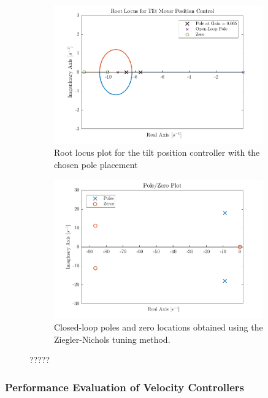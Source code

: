 \documentclass[../../main.tex]{subfiles}
\begin{document}
\begin{figure}[h]
\begin{subfigure}{0.49\textwidth}
    \includegraphics[width = 0.99\textwidth]{Sections/System_Design/Images/RL_TiltMotorVelPolePlace.png}
    \caption{Root locus plot for the tilt position controller with the chosen pole placement}
    \label{fig:vel_root_locus}
\end{subfigure}\quad
\begin{subfigure}{0.49\textwidth}
    \includegraphics[width = 0.99\textwidth]{Sections/System_Design/Images/PoleZero_TiltMotorVel_NZ.png}
    \caption{Closed-loop poles and zero locations obtained using the Ziegler-Nichols tuning method.}
    \label{fig:ZN_pole_zero}
\end{subfigure}
\caption{?????}
\label{fig:vel_poles_zeros}
\end{figure}

\subsubsection*{Performance Evaluation of Velocity Controllers}
\end{document}
